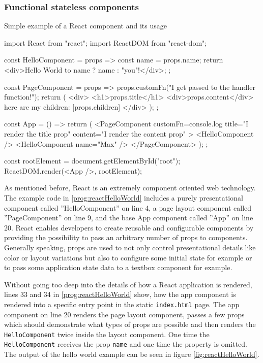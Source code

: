 \subsubsection{Functional stateless components}

\begin{program}
\caption{Simple example of a React component and its usage} 
\label{prog:reactHelloWorld}
\begin{JsCode}
import React from "react";
import ReactDOM from "react-dom";

const HelloComponent = props => {
  const name = props.name;
  return <div>Hello World to {name ? name : "you"}!</div>;
};

const PageComponent = props => {
  props.customFn("I get passed to the handler function!");
  return (
    <div>
      <h1>{props.title}</h1>
      <div>{props.content}</div>
      here are my children: [{props.children}]
    </div>
  );
};

const App = () => {
  return (
    <PageComponent
      customFn={console.log}
      title="I render the title prop"
      content="I render the content prop"
    >
      <HelloComponent />
      <HelloComponent name={"Max"} />
    </PageComponent>
  );
};

const rootElement = document.getElementById("root");
ReactDOM.render(<App />, rootElement);  
\end{JsCode}
\end{program}

As mentioned before, React is an extremely component oriented web technology. The example code in \ref{prog:reactHelloWorld} includes a purely presentational component called ''HelloComponent'' on line 4, a page layout component called ''PageComponent'' on line 9, and the base App component called ''App'' on line 20. React enables developers to create reusable and configurable components by providing the possibility to pass an arbitrary number of props to components. Generally speaking, props are used to not only control presentational details like color or layout variations but also to configure some initial state for example or to pass some application state data to a textbox component for example.

Without going too deep into the details of how a React application is rendered, lines 33 and 34 in \ref{prog:reactHelloWorld} show, how the app component is rendered into a specific entry point in the static \texttt{index.html} page. The app component on line 20 renders the page layout component, passes a few props which should demonstrate what types of props are possible and then renders the \texttt{HelloComponent} twice inside the layout component. One time the \texttt{HelloComponent} receives the prop \texttt{name} and one time the property is omitted. The output of the hello world example can be seen in figure \ref{fig:reactHelloWorld}. 

